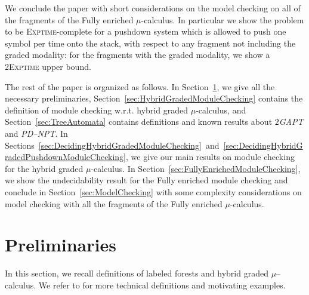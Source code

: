 \documentclass{LMCS}
\theoremstyle{plain}
\def \EXPTIME       {\textsc{Exptime}\xspace}
\def \PDNPT         {\emph{PD--NPT}\xspace}
\def \TGAPT         {\emph{$2$GAPT}\xspace}
\def \TWOEXPTIME    {\textsc{2Exptime}\xspace}
\newcommand \ignore[1] {}
\begin{document}
We conclude the paper with short considerations on the model
checking on all of the fragments of the Fully enriched
$\mu$-calculus. In particular we show the problem to be
\EXPTIME-complete for a pushdown system which is allowed to push
one symbol per time onto the stack, with respect to any fragment
not including the graded modality: for the fragments with the
graded modality, we show a \TWOEXPTIME upper bound.

\ignore{ Ricordarsi di dire qualcosa sul model checking per il
$\mu$-calculus classico citando i lavori di Igor Walukiewicz e
altri (vedi anche citazioni di Igor Walukiewicz )

Ricordarsi di citare la survey sul $\mu$-calculus del 2007 di
Stirling e Bradfield. }

The rest of the paper is organized as follows. In
Section~\ref{sec:Preliminaries}, we give all the necessary preliminaries,
Section~\ref{sec:HybridGradedModuleChecking} contains the definition of module
checking w.r.t. hybrid graded $\mu$-calculus, and
Section~\ref{sec:TreeAutomata} contains definitions and known results about
\TGAPT and \PDNPT. In
Sections~\ref{sec:DecidingHybridGradedModuleChecking}~and~\ref{sec:DecidingHybridGradedPushdownModuleChecking},
we give our main results on module checking for the hybrid graded
$\mu$-calculus. In Section~\ref{sec:FullyEnrichedModuleChecking}, we show the
undecidability result for the Fully enriched module checking and conclude in
Section~\ref{sec:ModelChecking} with some complexity considerations on model
checking with all the fragments of the Fully enriched $\mu$-calculus.

\section{Preliminaries}\label{sec:Preliminaries}
In this section, we recall definitions of labeled forests and hybrid graded
$\mu$--calculus. We refer to \cite{BLMV06} for more technical definitions and
motivating examples.
\end{document}
